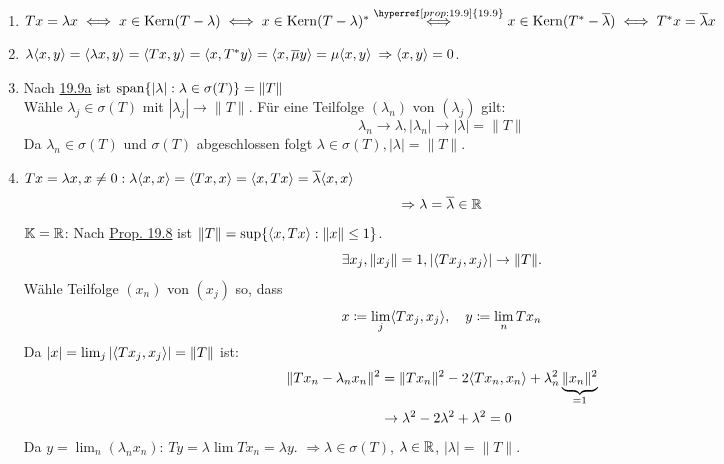 \begin{beweis}
	\begin{enumerate}[label=\alph*\upshape)]
		\item $T x = \lambda x \gdw x \in \kernn(T - \lambda) \gdw x \in \kernn(T - \lambda)^{*} \overset{\hyperref[prop:19.9]{19.9}}{\gdw} x \in \kernn(T^{*} - \overline{\lambda}) \gdw T^{*} x = \overline{\lambda} x$
		\item $\lambda \langle x , y \rangle = \langle \lambda x , y \rangle = \langle T x , y \rangle = \langle x , T^{*} y \rangle = \langle x , \overline{\mu} y \rangle = \mu \langle x, y \rangle$ $\Rightarrow \langle x , y \rangle = 0$.
		\item Nach \hyperref[prop:19.9]{19.9a} ist $\operatorname{span} \{ | \lambda | : \lambda \in \sigma(T) \} = \| T \|$ \\
			Wähle $\lambda_{j} \in \sigma(T)$ mit $| \lambda_{j}| \rightarrow \| T \|$. Für eine Teilfolge $(\lambda_{n})$ von $(\lambda_{j})$ gilt: 
			\[ \lambda_{n} \rightarrow \lambda, | \lambda_{n} | \rightarrow | \lambda | = \| T \| \]
			Da $\lambda_{n} \in \sigma(T)$ und $\sigma(T)$ abgeschlossen folgt $\lambda \in \sigma(T), | \lambda | = \| T \|$.
		\item $T x = \lambda x, x \neq 0: \lambda \langle x, x \rangle = \langle T x , x \rangle = \langle x , T x \rangle = \overline{\lambda} \langle x , x \rangle$ \\
			\[ \Rightarrow \lambda = \overline{\lambda} \in \mathbb{R} \]
			$\mathbb{K} = \mathbb{R}$: Nach \hyperref[prop:19.8]{Prop. 19.8} ist $\| T \| = \sup \{ \langle x , Tx \rangle : \| x \| \leq 1\}$. \\
			\[ \exists x_{j}, \| x_{j} \| = 1, | \langle T x_{j} , x_{j} \rangle | \rightarrow \| T \|. \]
			Wähle Teilfolge $(x_{n})$ von $(x_{j})$ so, dass 
			\[ x \coloneqq \lim_{j} \langle T x_{j}, x_{j} \rangle, \quad y \coloneqq \lim_{n} T x_{n} \]
			Da $|x| = \lim_{j} | \langle T x_{j} , x_{j} \rangle | = \| T \|$ ist:
			\begin{align*}
				\| T x_{n} - \lambda_{n} x_{n} \|^{2} & = \| T x_{n} \|^{2} - 2 \langle T x_{n} , x_{n} \rangle + \lambda_{n}^{2} \underbrace{\| x_{n} \|^{2}}_{= 1} \\
				& \rightarrow \lambda^{2} - 2 \lambda^{2} + \lambda^{2} = 0
			\end{align*} 
			Da $y = \lim_{n} \left( \lambda_{n} x_{n} \right)$: $T y = \lambda \lim T x_{n} = \lambda y$. $\Rightarrow \lambda \in \sigma(T)$, $\lambda \in \mathbb{R}$, $| \lambda | = \| T \|$.
	\end{enumerate}	
\end{beweis}


